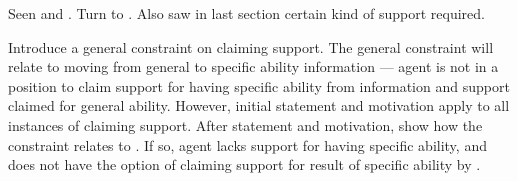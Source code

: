 \begin{note}
  Seen \uRa{} and \WR{}.
  Turn to \AR{}.
  Also saw in last section certain kind of support required.

  Introduce a general constraint on claiming support.
  The general constraint will relate to moving from general to specific ability information --- agent is not in a position to claim support for having specific ability from information and support claimed for general ability.
  However, initial statement and motivation apply to all instances of claiming support.
  After statement and motivation, show how the constraint relates to \AR{}.
  If so, agent lacks support for having specific ability, and does not have the option of claiming support for result of specific ability by \AR{}.
\end{note}

